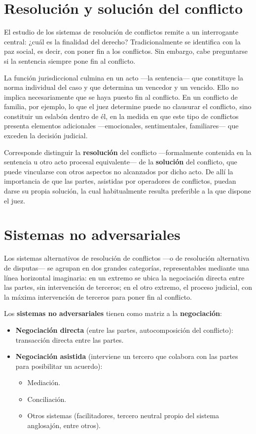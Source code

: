 \documentclass[12pt,oneside]{book}
\begin{document}
\section{Resolución y solución del conflicto}

El estudio de los sistemas de resolución de conflictos remite a un interrogante central: ¿cuál es la finalidad del derecho? Tradicionalmente se identifica con la paz social, es decir, con poner fin a los conflictos. Sin embargo, cabe preguntarse si la sentencia siempre pone fin al conflicto.

La función jurisdiccional culmina en un acto ---la sentencia--- que constituye la norma individual del caso y que determina un vencedor y un vencido. Ello no implica necesariamente que se haya puesto fin al conflicto. En un conflicto de familia, por ejemplo, lo que el juez determine puede no clausurar el conflicto, sino constituir un eslabón dentro de él, en la medida en que este tipo de conflictos presenta elementos adicionales ---emocionales, sentimentales, familiares--- que exceden la decisión judicial.

\begin{important}
Corresponde distinguir la \textbf{resolución} del conflicto ---formalmente contenida en la sentencia u otro acto procesal equivalente--- de la \textbf{solución} del conflicto, que puede vincularse con otros aspectos no alcanzados por dicho acto. De allí la importancia de que las partes, asistidas por operadores de conflictos, puedan darse su propia solución, la cual habitualmente resulta preferible a la que dispone el juez.
\end{important}

\section{Sistemas no adversariales}

Los sistemas alternativos de resolución de conflictos ---o de resolución alternativa de disputas--- se agrupan en dos grandes categorías, representables mediante una línea horizontal imaginaria: en un extremo se ubica la negociación directa entre las partes, sin intervención de terceros; en el otro extremo, el proceso judicial, con la máxima intervención de terceros para poner fin al conflicto.

Los \textbf{sistemas no adversariales} tienen como matriz a la \textbf{negociación}:
\begin{itemize}
    \item \textbf{Negociación directa} (entre las partes, autocomposición del conflicto): transacción directa entre las partes.
    \item \textbf{Negociación asistida} (interviene un tercero que colabora con las partes para posibilitar un acuerdo):
    \begin{itemize}
        \item Mediación.
        \item Conciliación.
        \item Otros sistemas (facilitadores, tercero neutral propio del sistema anglosajón, entre otros).
    \end{itemize}
\end{itemize}
\end{document}
